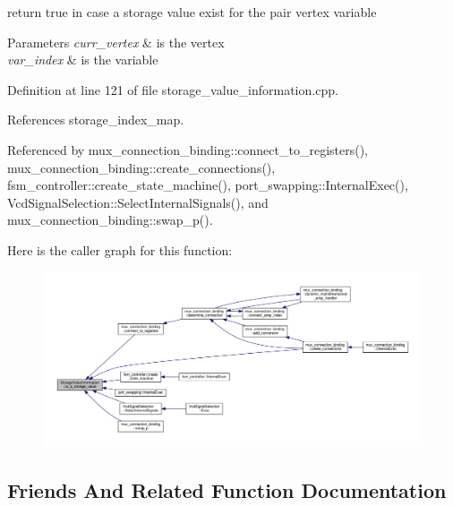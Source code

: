 return true in case a storage value exist for the pair vertex variable 


\begin{DoxyParams}{Parameters}
{\em curr\+\_\+vertex} & is the vertex \\
\hline
{\em var\+\_\+index} & is the variable \\
\hline
\end{DoxyParams}


Definition at line 121 of file storage\+\_\+value\+\_\+information.\+cpp.



References storage\+\_\+index\+\_\+map.



Referenced by mux\+\_\+connection\+\_\+binding\+::connect\+\_\+to\+\_\+registers(), mux\+\_\+connection\+\_\+binding\+::create\+\_\+connections(), fsm\+\_\+controller\+::create\+\_\+state\+\_\+machine(), port\+\_\+swapping\+::\+Internal\+Exec(), Vcd\+Signal\+Selection\+::\+Select\+Internal\+Signals(), and mux\+\_\+connection\+\_\+binding\+::swap\+\_\+p().

Here is the caller graph for this function\+:
\nopagebreak
\begin{figure}[H]
\begin{center}
\leavevmode
\includegraphics[width=350pt]{d8/dbe/classStorageValueInformation_ad1eb25efaf228bcf4d2b3d62b7b6d102_icgraph}
\end{center}
\end{figure}


\subsection{Friends And Related Function Documentation}
\mbox{\label{classStorageValueInformation_ad8261cbbbabaa93fee0cbe16ef21f3ff}} 
